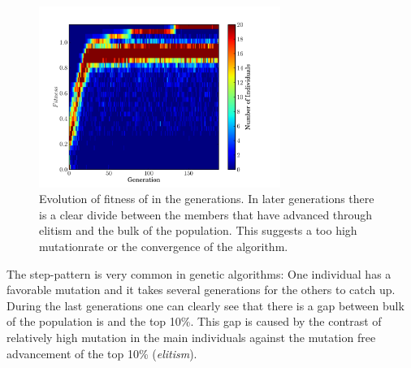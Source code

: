 \begin{figure}[htbp] %
   \centering
   \includegraphics[width=0.7\textwidth]{chapter_dalek/plots/plot_02bo_fit_evol.pdf} 
     \caption{Evolution of fitness of in the generations. In later generations there is a clear divide between the members that have advanced through elitism and the bulk of the population. This suggests a too high mutationrate or the convergence of the algorithm. }
   \label{fig:fitness_evolution}
\end{figure}

The step-pattern is very common in genetic algorithms: One individual has a favorable mutation and it takes several generations for the others to catch up. During the last generations one can clearly see that there is a gap between bulk of the population is and the top 10\%. This gap is caused by the contrast of relatively high mutation in the main individuals against the mutation free advancement of the top 10\% (\textit{elitism}).


